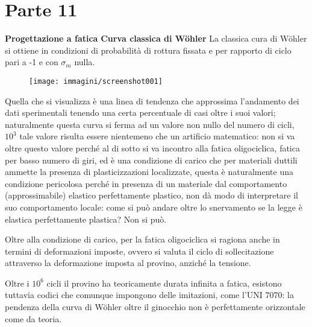 \documentclass{article}
\def\outcome{\textbf{Learning Outcomes:} Outcomes go here. }
\begin{document}
	\section*{Parte 11} %

\begin{adjustwidth}{2in}{} 
	
\textbf{{\LARGE Progettazione a fatica}} \mbox{} \newline
\textbf{{\Large Curva classica di Wöhler}} \mbox{} \newline
			La classica cura di Wöhler si ottiene in condizioni di probabilità di rottura fissata e per rapporto di ciclo pari a -1 e con $\sigma_m$ nulla.
			\begin{figure}[H]
				\centering
				\texttt{[image: immagini/screenshot001]}
				\label{fig:screenshot001}
			\end{figure}			
			Quella che si visualizza è una linea di tendenza che approssima l'andamento dei dati sperimentali tenendo una certa percentuale di casi oltre i suoi valori; naturalmente questa curva si ferma ad un valore non nullo del numero di cicli, $10^3$ tale valore risulta essere nientemeno che un artificio matematico: non si va oltre questo valore perché al di sotto si va incontro alla fatica oligociclica, fatica per basso numero di giri, ed è una condizione di carico che per materiali duttili ammette la presenza di plasticizzazioni localizzate, questa è naturalmente una condizione pericolosa perché in presenza di un materiale dal comportamento (approssimabile) elastico perfettamente plastico, non dà modo di interpretare il suo comportamento locale: come si può andare oltre lo snervamento se la legge è elastica perfettamente plastica? Non si può.
			
			Oltre alla condizione di carico, per la fatica oligociclica si ragiona anche in termini di deformazioni imposte, ovvero si valuta il ciclo di sollecitazione attraverso la deformazione imposta al provino, anziché la tensione. \newline
			
			Oltre i $10^6$ cicli il provino ha teoricamente durata infinita a fatica, esistono tuttavia codici che comunque impongono delle imitazioni, come l'UNI 7070: la pendenza della curva di Wöhler oltre  il ginocchio non è perfettamente orizzontale come da teoria. \newline
			

\end{adjustwidth}
\end{document}
